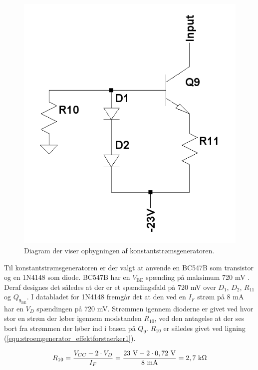 \begin{figure}[h]
\centering
\includegraphics[scale=0.35]{teknisk/effektforstaerker/stoemgenerator.png}
\caption{Diagram der viser opbygningen af konstantstrømsgeneratoren.}
\label{konstantstroemsgenerator_model}
\end{figure}

Til konstantstrømsgeneratoren er der valgt at anvende en BC547B som transistor og en 1N4148 som diode. BC547B har en $V_\mathrm{BE}$ spænding på maksimum 720 mV \cite{bc547b-datablad}. Deraf designes det således at der er et spændingsfald på 720 mV over $D_1$, $D_2$, $R_{\mathrm{11}}$ og $Q_{9_\mathrm{BE}}$. I databladet for 1N4148 \cite{1n4148-datablad} fremgår det at den  ved en $I_F$ strøm på 8 mA har en $V_D$ spændingen på 720 mV. Strømmen igennem dioderne er givet ved hvor stor en strøm der løber igennem modstanden $R_{\mathrm{10}}$, ved den antagelse at der ses bort fra strømmen der løber ind i basen på $Q_9$. $R_{\mathrm{10}}$ er således givet ved ligning (\ref{equ:stroemgenerator_effektforstaerker1}).

\begin{equation}
\label{equ:stroemgenerator_effektforstaerker1}
R_{\mathrm{10}} = \frac{V_{CC} - 2 \cdot V_D}{I_F} = \mathrm{\frac{23~\mathrm{V} - 2 \cdot 0,72~\mathrm{V}}{8~\mathrm{mA}} = 2,7~\mathrm{k}\ohm}
\end{equation}

